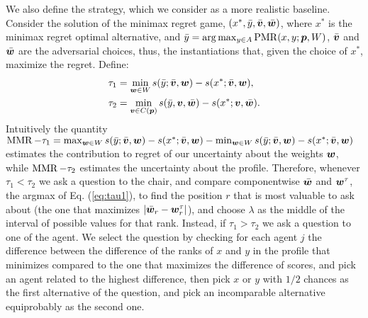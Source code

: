 We also define the  strategy, which we consider as a more realistic baseline. 
Consider the solution of the minimax regret game, 
 $(x^{*},\bar{y},\bar{\bm{v}},\bar{\bm{w}})$, where $x^{*}$ is the minimax regret optimal alternative, and $\bar{y} = \arg \max_{y \in A} \operatorname{PMR}(x,y; {\bm{p}}, W)$, $\bar{\bm{v}}$ and $\bar{\bm{w}}$ are the adversarial choices, thus, the instantiations that, given the choice of $x^*$, maximize the regret. 
Define: 
\begin{align}
\tau_{1} & = \min_{\bm{w} \in W} s(\bar{y}; \bar{\bm{v}}, \bm{w}) - s(x^{*}; \bar{\bm{v}}, \bm{w}),  \label{eq:tau1} \\
\tau_{2} & = \min_{\bm{v} \in C({\bm{p}})} s(\bar{y},\bm{v}, \bar{\bm{w}}) -  s(x^{*}; \bm{v}, \bar{\bm{w}}).
\end{align}
Intuitively the quantity $\operatorname{MMR} - \tau_{1} = \max_{\bm{w} \in W} s(\bar{y}; \bar{\bm{v}}, \bm{w}) - s(x^{*}; \bar{\bm{v}}, \bm{w}) - \min_{\bm{w} \in W} s(\bar{y}; \bar{\bm{v}}, \bm{w}) - s(x^{*}; \bar{\bm{v}}, \bm{w})$ estimates the contribution to regret of our uncertainty about the weights $\bm{w}$, while $\operatorname{MMR} - \tau_{2} $ estimates the uncertainty about the profile.
Therefore, whenever $\tau_{1} < \tau_{2}$ we ask a question to the chair, and compare componentwise $\bar{\bm{w}}$ and $\bm{w}^{\tau}$, the argmax of Eq. (\ref{eq:tau1}), to find the position $r$ that is most valuable to ask about (the one that maximizes $\lvert\bar{\bm{w}}_r - \bm{w}^{\tau}_r\rvert$), and choose $\lambda$ as the middle of the interval of possible values for that rank.
Instead, if $\tau_{1} > \tau_{2}$ we ask a question to one of the agent. We select the question by checking for each agent $j$ the difference between the difference of the ranks of $x$ and $y$ in the profile that minimizes compared to the one that maximizes the difference of scores, and pick an agent related to the highest difference, then pick $x$ or $y$ with $1/2$ chances as the first alternative of the question, and pick an incomparable alternative equiprobably as the second one.

